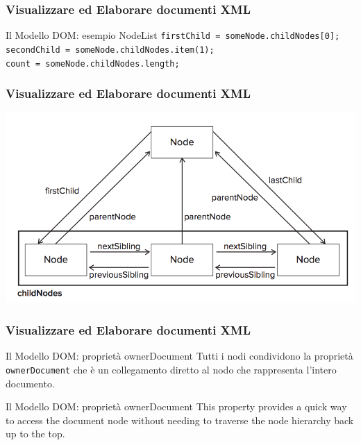 \begin{frame}
    \frametitle{Visualizzare ed Elaborare documenti XML}
    \addtocounter{nframe}{1}
    

     \begin{block}{Il Modello DOM: esempio NodeList}
        \texttt{firstChild = someNode.childNodes[0];}
        \\\texttt{secondChild = someNode.childNodes.item(1); }
        \\\texttt{count = someNode.childNodes.length;}
     \end{block}

\end{frame}

\begin{frame}
    \frametitle{Visualizzare ed Elaborare documenti XML}
    \addtocounter{nframe}{1}
    
    \begin{center}
        \includegraphics[width=.8\textwidth]{imgs/nodeRelations.png}
    \end{center}

\end{frame}

\begin{frame}
    \frametitle{Visualizzare ed Elaborare documenti XML}
    \addtocounter{nframe}{1}
    

     \begin{block}{Il Modello DOM: proprietà ownerDocument}
        Tutti i nodi condividono la proprietà \texttt{ownerDocument} che è un collegamento diretto al nodo che rappresenta l'intero documento.
     \end{block}

     \begin{block}{Il Modello DOM: proprietà ownerDocument}
        This property provides a quick way to access the document node without needing to traverse the node hierarchy back up to the top.
     \end{block}

\end{frame}

